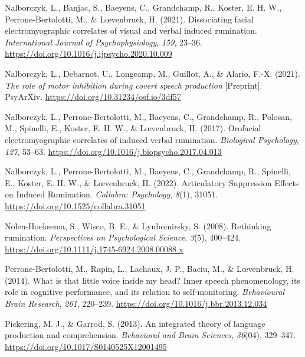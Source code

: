 \documentclass[
  man, donotrepeattitle,floatsintext]{apa6}
\newlength{\cslhangindent}
\newlength{\cslentryspacingunit} %
\newenvironment{CSLReferences}[2] %
 {%
  \setlength{\parindent}{0pt}
  \ifodd #1
  \let\oldpar\par
  \def\par{\hangindent=\cslhangindent\oldpar}
  \fi
  \setlength{\parskip}{#2\cslentryspacingunit}
 }%
 {}
\begin{document}
\begin{CSLReferences}{1}{0}
\leavevmode{}%
Nalborczyk, L., Banjac, S., Baeyens, C., Grandchamp, R., Koster, E. H. W., Perrone-Bertolotti, M., \& Lœvenbruck, H. (2021). Dissociating facial electromyographic correlates of visual and verbal induced rumination. \emph{International Journal of Psychophysiology}, \emph{159}, 23--36. \url{https://doi.org/10.1016/j.ijpsycho.2020.10.009}

\leavevmode{}%
Nalborczyk, L., Debarnot, U., Longcamp, M., Guillot, A., \& Alario, F.-X. (2021). \emph{The role of motor inhibition during covert speech production} {[}Preprint{]}. PsyArXiv. \url{https://doi.org/10.31234/osf.io/3df57}

\leavevmode{}%
Nalborczyk, L., Perrone-Bertolotti, M., Baeyens, C., Grandchamp, R., Polosan, M., Spinelli, E., Koster, E. H. W., \& Lœvenbruck, H. (2017). Orofacial electromyographic correlates of induced verbal rumination. \emph{Biological Psychology}, \emph{127}, 53--63. \url{https://doi.org/10.1016/j.biopsycho.2017.04.013}

\leavevmode{}%
Nalborczyk, L., Perrone-Bertolotti, M., Baeyens, C., Grandchamp, R., Spinelli, E., Koster, E. H. W., \& Lœvenbruck, H. (2022). Articulatory {Suppression} {Effects} on {Induced} {Rumination}. \emph{Collabra: Psychology}, \emph{8}(1), 31051. \url{https://doi.org/10.1525/collabra.31051}

\leavevmode{}%
Nolen-Hoeksema, S., Wisco, B. E., \& Lyubomirsky, S. (2008). Rethinking rumination. \emph{Perspectives on Psychological Science}, \emph{3}(5), 400--424. \url{https://doi.org/10.1111/j.1745-6924.2008.00088.x}

\leavevmode{}%
Perrone-Bertolotti, M., Rapin, L., Lachaux, J. P., Baciu, M., \& Lœvenbruck, H. (2014). What is that little voice inside my head? {Inner} speech phenomenology, its role in cognitive performance, and its relation to self-monitoring. \emph{Behavioural Brain Research}, \emph{261}, 220--239. \url{https://doi.org/10.1016/j.bbr.2013.12.034}

\leavevmode{}%
Pickering, M. J., \& Garrod, S. (2013). An integrated theory of language production and comprehension. \emph{Behavioral and Brain Sciences}, \emph{36}(04), 329--347. \url{https://doi.org/10.1017/S0140525X12001495}


\end{CSLReferences}
\end{document}
